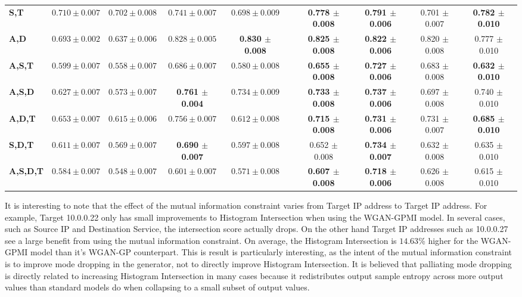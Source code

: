 \begin{table}[!htbp]
\begin{adjustbox}{angle=90}
\begin{tabular}{l|c|c|c|c|c|c|c|c|c|}
		\textbf{S,T} & $0.710 \pm 0.007$ & $0.702 \pm 0.008$ & $0.741 \pm 0.007$ & $0.698 \pm 0.009$ & & \textbf{0.778 $\pm$ 0.008} & \textbf{0.791 $\pm$ 0.006} & 0.701 $\pm$ 0.007 & \textbf{0.782 $\pm$ 0.010} \\
		\textbf{A,D} & $0.693 \pm 0.002$ & $0.637 \pm 0.006$ & $0.828 \pm 0.005$ & \textbf{0.830 $\pm$ 0.008} & & \textbf{0.825 $\pm$ 0.008} & \textbf{0.822 $\pm$ 0.006} & 0.820 $\pm$ 0.008 & 0.777 $\pm$ 0.010 \\ \hline
		\textbf{A,S,T} & $0.599 \pm 0.007$ & $0.558 \pm 0.007$ & $0.686 \pm 0.007$ & $0.580 \pm 0.008$ & & \textbf{0.655 $\pm$ 0.008} & \textbf{0.727 $\pm$ 0.006} & 0.683 $\pm$ 0.008 & \textbf{0.632 $\pm$ 0.010} \\
		\textbf{A,S,D} & $0.627 \pm 0.007$ & $0.573 \pm 0.007$ & \textbf{0.761 $\pm$ 0.004} & $0.734 \pm 0.009$ & & \textbf{0.733 $\pm$ 0.008} & \textbf{0.737 $\pm$ 0.006} & 0.697 $\pm$ 0.008 & 0.740 $\pm$ 0.010 \\
		\textbf{A,D,T} & $0.653 \pm 0.007$ & $0.615 \pm 0.006$ & $0.756 \pm 0.007$ & $0.612 \pm 0.008$ & & \textbf{0.715 $\pm$ 0.008} & \textbf{0.731 $\pm$ 0.006} & 0.731 $\pm$ 0.007 & \textbf{0.685 $\pm$ 0.010} \\
		\textbf{S,D,T} & $0.611 \pm 0.007$ & $0.569 \pm 0.007$ & \textbf{0.690 $\pm$ 0.007} & $0.597 \pm 0.008$ & & 0.652 $\pm$ 0.008 & \textbf{0.734 $\pm$ 0.007} & 0.632 $\pm$ 0.008 & 0.635 $\pm$ 0.010 \\ \hline
		\textbf{A,S,D,T} & $0.584 \pm 0.007$ & $0.548 \pm 0.007$ & $0.601 \pm 0.007$ & $0.571 \pm 0.008$ & & \textbf{0.607 $\pm$ 0.008} & \textbf{0.718 $\pm$ 0.006} & 0.626 $\pm$ 0.008 & 0.615 $\pm$ 0.010 \\
	\end{tabular}
	\end{adjustbox}
\end{table}

It is interesting to note that the effect of the mutual information constraint varies from Target IP address to Target IP address. For example, Target 10.0.0.22 only has small improvements to Histogram Intersection when using the WGAN-GPMI model. In several cases, such as Source IP and Destination Service, the intersection score actually drops. On the other hand Target IP addresses such as 10.0.0.27 see a large benefit from using the mutual information constraint. On average, the Histogram Intersection is $14.63$\% higher for the WGAN-GPMI model than it's WGAN-GP counterpart. This is result is particularly interesting, as the intent of the mutual information constraint is to improve mode dropping in the generator, not to directly improve Histogram Intersection. It is believed that palliating mode dropping is directly related to increasing Histogram Intersection in many cases because it redistributes output sample entropy across more output values than standard models do when collapsing to a small subset of output values.

